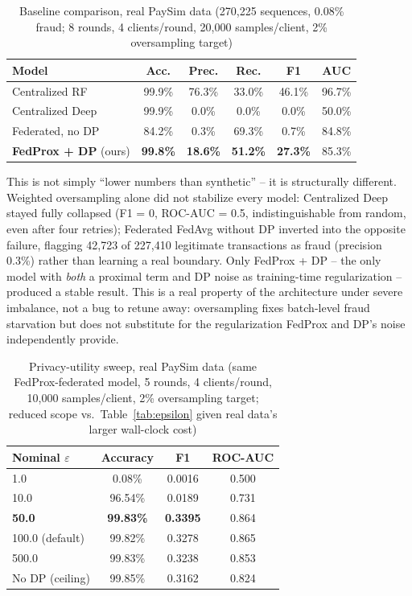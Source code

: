 \documentclass[12pt]{svproc}
\begin{document}
\begin{table}[!t]
\caption{Baseline comparison, real PaySim data (270{,}225 sequences, 0.08\% fraud; 8 rounds, 4 clients/round, 20{,}000 samples/client, 2\% oversampling target)}
\label{tab:comparison-real}
\centering
\begin{tabular}{@{}lccccc@{}}
\toprule
Model & Acc. & Prec. & Rec. & F1 & AUC \\
\midrule
Centralized RF          & 99.9\% & 76.3\% & 33.0\% & 46.1\% & 96.7\% \\
Centralized Deep        & 99.9\% & 0.0\%  & 0.0\%  & 0.0\%  & 50.0\% \\
Federated, no DP        & 84.2\% & 0.3\%  & 69.3\% & 0.7\%  & 84.8\% \\
\textbf{FedProx + DP} (ours) & \textbf{99.8\%} & \textbf{18.6\%} & \textbf{51.2\%} & \textbf{27.3\%} & 85.3\% \\
\bottomrule
\end{tabular}
\end{table}

This is not simply ``lower numbers than synthetic'' -- it is
structurally different. Weighted oversampling alone did not stabilize
every model: Centralized Deep stayed fully collapsed (F1 = 0, ROC-AUC =
0.5, indistinguishable from random, even after four retries); Federated
FedAvg without DP inverted into the opposite failure, flagging
42{,}723 of 227{,}410 legitimate transactions as fraud (precision
0.3\%) rather than learning a real boundary. Only FedProx + DP -- the
only model with \emph{both} a proximal term and DP noise as
training-time regularization -- produced a stable result. This is a
real property of the architecture under severe imbalance, not a bug to
retune away: oversampling fixes batch-level fraud starvation but does
not substitute for the regularization FedProx and DP's noise
independently provide.

\begin{table}[!t]
\caption{Privacy-utility sweep, real PaySim data (same FedProx-federated model, 5 rounds, 4 clients/round, 10{,}000 samples/client, 2\% oversampling target; reduced scope vs.\ Table~\ref{tab:epsilon} given real data's larger wall-clock cost)}
\label{tab:epsilon-real}
\centering
\begin{tabular}{@{}lccc@{}}
\toprule
Nominal $\varepsilon$ & Accuracy & F1 & ROC-AUC \\
\midrule
1.0   & 0.08\%  & 0.0016 & 0.500 \\
10.0  & 96.54\% & 0.0189 & 0.731 \\
\textbf{50.0}  & \textbf{99.83\%} & \textbf{0.3395} & 0.864 \\
100.0 (default) & 99.82\% & 0.3278 & 0.865 \\
500.0 & 99.83\% & 0.3238 & 0.853 \\
No DP (ceiling) & 99.85\% & 0.3162 & 0.824 \\
\bottomrule
\end{tabular}
\end{table}
\end{document}

